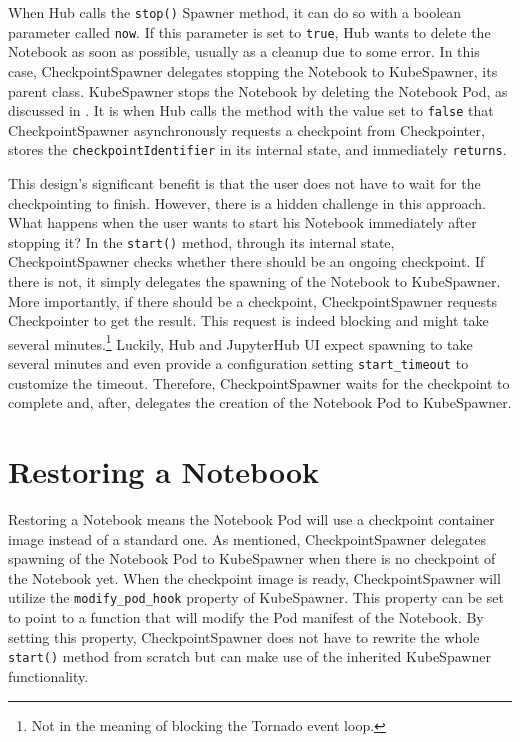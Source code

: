 \documentclass[
  digital,     %
  oneside,     %
  nosansbold,  %
  nocolorbold, %
  lof,         %
  nolot,         %
]{fithesis4}
\begin{document}
When Hub calls the \texttt{stop()} Spawner method, it can do so with a boolean parameter called \texttt{now}. If this parameter is set to \texttt{true}, Hub wants to delete the Notebook as soon as possible, usually as a cleanup due to some error. In this case, CheckpointSpawner delegates stopping the Notebook to KubeSpawner, its parent class.
KubeSpawner stops the Notebook by deleting the Notebook Pod, as discussed in .
It is when Hub calls the method with the value set to \texttt{false} that CheckpointSpawner asynchronously requests a checkpoint from Checkpointer, stores the \texttt{checkpointIdentifier} in its internal state, and immediately \texttt{returns}.

This design's significant benefit is that the user does not have to wait for the checkpointing to finish. However, there is a hidden challenge in this approach. What happens when the user wants to start his Notebook immediately after stopping it? In the \texttt{start()} method, through its internal state, CheckpointSpawner checks whether there should be an ongoing checkpoint. If there is not, it simply delegates the spawning of the Notebook to KubeSpawner. More importantly, if there should be a checkpoint, CheckpointSpawner requests Checkpointer to get the result. This request is indeed blocking and might take several minutes.\footnote{Not in the meaning of blocking the Tornado event loop.}
Luckily, Hub and JupyterHub UI expect spawning to take several minutes and even provide a configuration setting \texttt{start\_timeout} to customize the timeout. Therefore, CheckpointSpaw\-ner waits for the checkpoint to complete and, after, delegates the creation of the Notebook Pod to KubeSpawner.

\section{Restoring a Notebook}
Restoring a Notebook means the Notebook Pod will use a checkpoint container image instead of a standard one. As mentioned, CheckpointSpawner delegates spawning of the Notebook Pod to KubeSpawner when there is no checkpoint of the Notebook yet. When the checkpoint image is ready, CheckpointSpawner will utilize the \texttt{modify\_pod\_hook} property of KubeSpawner. This property can be set to point to a function that will modify the Pod manifest of the Notebook. By setting this property, CheckpointSpawner does not have to rewrite the whole \texttt{start()} method from scratch but can make use of the inherited KubeSpawner functionality.
\end{document}
